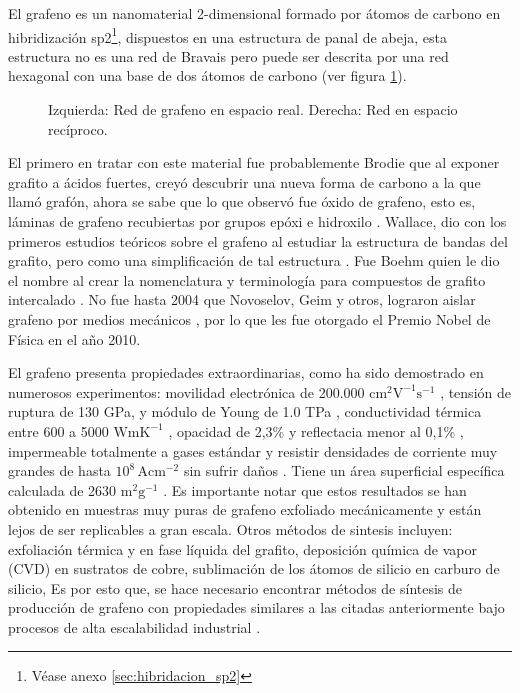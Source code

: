
El grafeno es un nanomaterial 2-dimensional formado por átomos de carbono en hibridización sp2\footnote{Véase anexo  \ref{sec:hibridacion_sp2}}, dispuestos en una estructura de panal de abeja, esta estructura no es una red de Bravais pero puede ser descrita por una red hexagonal con una base de dos átomos de carbono (ver figura \ref{fig_graphene_lattice}). 

\begin{figure}
	\centering
	\caption[Estructura cristalina del grafeno]{Izquierda: Red de grafeno en espacio real. Derecha: Red en espacio recíproco.}
	\label{fig_graphene_lattice}
\end{figure}

El primero en tratar con este material fue probablemente Brodie \citep{Brodie1859} que al exponer grafito a ácidos fuertes, creyó descubrir una nueva forma de carbono a la que llamó grafón, ahora se sabe que lo que observó fue óxido de grafeno, esto es, láminas de grafeno recubiertas por grupos epóxi e hidroxilo \citep{Geim2012}. Wallace, dio con los primeros estudios teóricos sobre el grafeno al estudiar la estructura de bandas del grafito, pero como una simplificación de tal estructura \citep{Wallace1947}. Fue Boehm quien le dio el nombre al crear la nomenclatura y terminología para compuestos de grafito intercalado \citep{Boehm1986}. No fue hasta 2004 que Novoselov, Geim y otros, lograron aislar grafeno por medios mecánicos \citep{Novoselov2004}, por lo que les fue otorgado el Premio Nobel de Física en el año 2010.

El grafeno presenta propiedades extraordinarias, como ha sido demostrado en numerosos experimentos: movilidad electrónica de 200.000 $\mathrm{cm^2 V^{-1} s^{-1} }$ \citep{Bolotin2008}, tensión de ruptura de 130 GPa, y módulo de Young de 1.0 TPa \citep{Lee2008}, conductividad térmica entre 600 a 5000 $\mathrm{W mK^{-1}}$ \citep{Balandin2011}, opacidad de 2,3\% y reflectacia menor al 0,1\% \citep{Nair2008}, impermeable totalmente a gases estándar \citep{Bunch2008} y resistir densidades de corriente muy grandes de hasta $\mathrm{10^8\,A cm^{-2}}$ sin sufrir daños  \citep{Moser2007}. Tiene un área superficial específica calculada de 2630 $\mathrm{m^2 g^{-1}}$ \citep{Peigney2001}. Es importante notar que estos resultados se han obtenido en muestras muy puras de grafeno exfoliado mecánicamente \citep{Novoselov2004} y están lejos de ser replicables a gran escala. Otros métodos de sintesis incluyen: exfoliación térmica y en fase líquida del grafito\citep{Blake2008}, deposición química de vapor (CVD) en sustratos de cobre, sublimación de los átomos de silicio en carburo de silicio\citep{DeHeer2011a},   Es por esto que, se hace necesario encontrar métodos de síntesis de producción de grafeno con propiedades similares a las citadas anteriormente bajo procesos de alta escalabilidad industrial \citep{Novoselov2012}.

